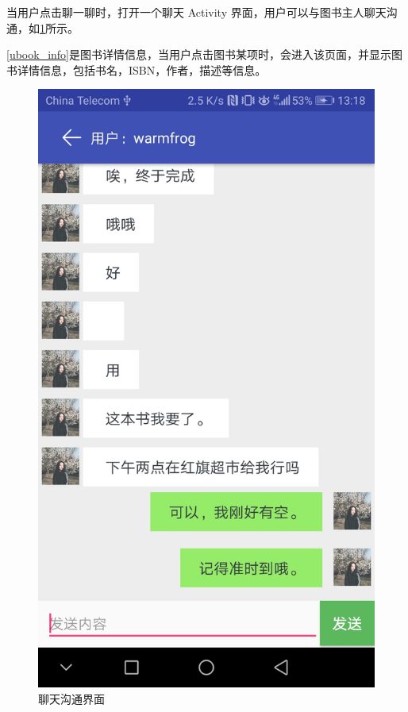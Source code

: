 当用户点击聊一聊时，打开一个聊天 Activity 界面，用户可以与图书主人聊天沟通，如\cref{talk}所示。

\cref{ubook_info}是图书详情信息，当用户点击图书某项时，会进入该页面，并显示图书详情信息，包括书名，ISBN，作者，描述等信息。

\begin{figure}[h]
	\centering
	\includegraphics[scale=0.09]{Chapters/UI/talk.jpg}
	\caption{聊天沟通界面}
	\label{talk}
\end{figure}

